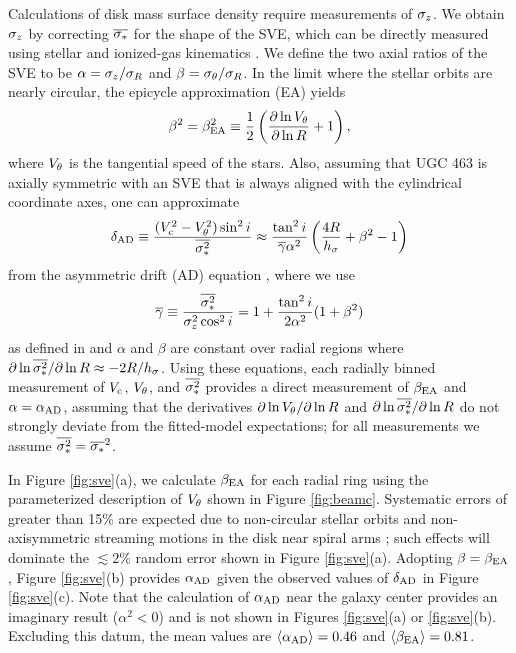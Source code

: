 \documentclass[apj,iop,numberedappendix]{emulateapj}
\begin{document}
Calculations of disk mass surface density require measurements of $\sigma_z$.  We
obtain $\sigma_z$ by correcting $\overline{\sigma_{\ast}}$ for the shape of the SVE, which
can be directly measured using stellar and ionized-gas kinematics
\citep{2003AJ....126.2707S, 2008MNRAS.388.1381N, KBWPhD}.  We define the two
axial ratios of the SVE to be $\alpha = \sigma_z/\sigma_R$ and $\beta = \sigma_{\theta}/\sigma_R$.
In the limit where the stellar orbits are nearly circular, the epicycle
approximation (EA) yields
%
\begin{equation}
%
\beta^2 = \beta_{\rm EA}^2 \equiv \frac{1}{2} \left(
\frac{\partial\ln\vt}{\partial \ln R} + 1\right),
%
\label{eq:ea}
%
\end{equation}
%
where $V_\theta$ is the tangential speed of the stars.  Also, assuming that UGC 463
is axially symmetric with an SVE that is always aligned with the cylindrical
coordinate axes, one can approximate
%
\begin{equation}
%
\dad \equiv \frac{(\vc^2-\vt^2)\sin^2i}{\azmean{\sstar^2}} \approx
\frac{\tan^2i}{\azmean{\gamma}\alpha^2} \left(\frac{4R}{h_{\sigma}} + \beta^2
- 1 \right)
%
\label{eq:dad}
%
\end{equation}
%
from the asymmetric drift (AD) equation \citep{2008gady.book.....B}, where we
use
%
\begin{equation}
%
\azmean{\gamma} \equiv \frac{\azmean{\sstar^2}}{\sigz^2\cos^2i} =
1+\frac{\tan^2i}{2\alpha^2}(1+\beta^2)
%
\label{eq:gamma}
%
\end{equation}
%
as defined in  and $\alpha$ and $\beta$ are
constant over radial regions where $\partial\ln\overline{\sigma_{\ast}^2}/\partial\ln R
\approx -2R/h_{\sigma}$.  Using these equations, each radially binned
measurement of $V_{\rm c}$, $V_\theta$, and $\overline{\sigma_{\ast}^2}$ provides a direct
measurement of $\beta_{\rm EA}$ and $\alpha = \alpha_{\rm AD}$, assuming that
the derivatives $\partial\ln V_\theta/\partial \ln R$ and $\partial
\ln\overline{\sigma_{\ast}^2} /\partial\ln R$ do not strongly deviate from the
fitted-model expectations; for all measurements we assume $\overline{\sigma_{\ast}^2} =
\overline{\sigma_{\ast}}^2$.

In Figure \ref{fig:sve}(a), we calculate $\beta_{\rm EA}$ for each radial ring
using the parameterized description of $V_\theta$ shown in Figure \ref{fig:beamc}.
Systematic errors of greater than 15\% are expected due to non-circular stellar
orbits \citep{1975ApJ...195..333V, 1991dodg.conf...71K, 1999AJ....118.1190D} and
non-axisymmetric streaming motions in the disk near spiral arms
\citep{2006MNRAS.373..197V,2008MNRAS.383..817V}; such effects will dominate the
$\lesssim 2$\% random error shown in Figure \ref{fig:sve}(a).  Adopting $\beta =
\beta_{\rm EA}$, Figure \ref{fig:sve}(b) provides $\alpha_{\rm AD}$ given the
observed values of $\delta_{\rm AD}$ in Figure \ref{fig:sve}(c).  Note that the calculation
of $\alpha_{\rm AD}$ near the galaxy center provides an imaginary result
($\alpha^2<0$) and is not shown in Figures \ref{fig:sve}(a) or \ref{fig:sve}(b).
Excluding this datum, the mean values are $\langle \alpha_{\rm AD} \rangle=0.46$ and
$\langle \beta_{\rm EA} \rangle = 0.81$.
\end{document}
